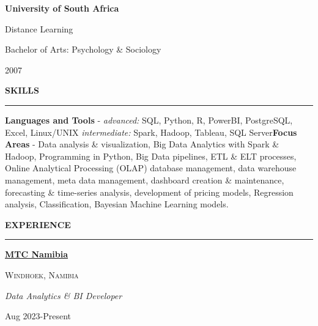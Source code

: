 \documentclass[
  letterpaper,
  DIV=11,
  numbers=noendperiod]{scrartcl}
\begin{document}
\begin{large}
  \begin{multicols}{2}
    \begin{flushleft}{\bf University of South Africa}\end{flushleft}
    \begin{flushright}Distance Learning\end{flushright}
  \end{multicols}
  \vspace{-0.17cm}
  \begin{multicols}{2}
    \begin{flushleft}Bachelor of Arts: Psychology \& Sociology\end{flushleft}
    \begin{flushright}2007\end{flushright}
  \end{multicols}
\end{large}

\vspace{1.5pt}

\begin{large}{\bf SKILLS}
  \vspace{3pt}
  \hrule
\end{large}

\textbf{Languages and Tools} - \emph{advanced:} SQL, Python, R, PowerBI,
PostgreSQL, Excel, Linux/UNIX \emph{intermediate:} Spark, Hadoop,
Tableau, SQL Server\newline \textbf{Focus Areas} - Data analysis \&
visualization, Big Data Analytics with Spark \& Hadoop, Programming in
Python, Big Data pipelines, ETL \& ELT processes, Online Analytical
Processing (OLAP) database management, data warehouse management, meta
data management, dashboard creation \& maintenance, forecasting \&
time-series analysis, development of pricing models, Regression
analysis, Classification, Bayesian Machine Learning models.

\vspace{5pt}

\begin{large}{\bf EXPERIENCE}
  \vspace{3pt}
  \hrule
  \begin{multicols}{2}
  \begin{flushleft}{\bf \href{https://www.mtc.com.na/}{MTC Namibia}}\end{flushleft}
    \begin{flushright}\textsc{Windhoek, Namibia}\end{flushright}
  \end{multicols}
  \vspace{-0.17cm}
  \begin{multicols}{2}
    \begin{flushleft}\textit{Data Analytics \& BI Developer}\end{flushleft}
    \begin{flushright}Aug 2023-Present\end{flushright}
  \end{multicols}
\end{large}
\vspace{-0.16cm}
\end{document}
